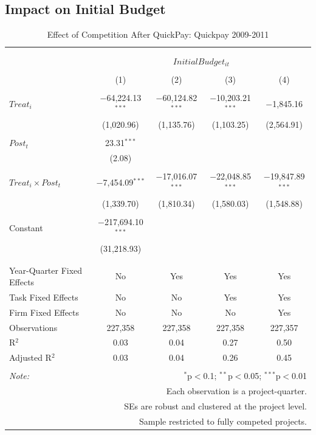 \documentclass[]{article}
\begin{document}
\hypertarget{impact-on-initial-budget}{%
\subsection{Impact on Initial Budget}\label{impact-on-initial-budget}}

\begin{table}[H] \centering 
  \caption{Effect of Competition After QuickPay: Quickpay 2009-2011} 
  \label{} 
\small 
\begin{tabular}{@{\extracolsep{-2pt}}lcccc} 
\\[-1.8ex]\hline 
\hline \\[-1.8ex] 
\\[-1.8ex] & \multicolumn{4}{c}{$InitialBudget_{it}$} \\ 
\\[-1.8ex] & (1) & (2) & (3) & (4)\\ 
\hline \\[-1.8ex] 
 $Treat_i$ & $-$64,224.13$^{***}$ & $-$60,124.82$^{***}$ & $-$10,203.21$^{***}$ & $-$1,845.16 \\ 
  & (1,020.96) & (1,135.76) & (1,103.25) & (2,564.91) \\ 
  & & & & \\ 
 $Post_t$ & 23.31$^{***}$ &  &  &  \\ 
  & (2.08) &  &  &  \\ 
  & & & & \\ 
 $Treat_i \times Post_t$ & $-$7,454.09$^{***}$ & $-$17,016.07$^{***}$ & $-$22,048.85$^{***}$ & $-$19,847.89$^{***}$ \\ 
  & (1,339.70) & (1,810.34) & (1,580.03) & (1,548.88) \\ 
  & & & & \\ 
 Constant & $-$217,694.10$^{***}$ &  &  &  \\ 
  & (31,218.93) &  &  &  \\ 
  & & & & \\ 
\hline \\[-1.8ex] 
Year-Quarter Fixed Effects & No & Yes & Yes & Yes \\ 
Task Fixed Effects & No & No & Yes & Yes \\ 
Firm Fixed Effects & No & No & No & Yes \\ 
Observations & 227,358 & 227,358 & 227,358 & 227,357 \\ 
R$^{2}$ & 0.03 & 0.04 & 0.27 & 0.50 \\ 
Adjusted R$^{2}$ & 0.03 & 0.04 & 0.26 & 0.45 \\ 
\hline 
\hline \\[-1.8ex] 
\textit{Note:}  & \multicolumn{4}{r}{$^{*}$p$<$0.1; $^{**}$p$<$0.05; $^{***}$p$<$0.01} \\ 
 & \multicolumn{4}{r}{Each observation is a project-quarter.} \\ 
 & \multicolumn{4}{r}{SEs are robust and clustered at the project level.} \\ 
 & \multicolumn{4}{r}{Sample restricted to fully competed projects.} \\ 
\end{tabular} 
\end{table}
\end{document}
